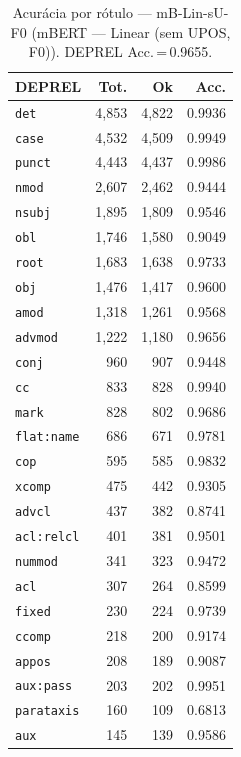\begin{table}[ht]
\centering
\caption{Acurácia por rótulo --- mB-Lin-sU-F0 (mBERT — Linear (sem UPOS, F0)). DEPREL Acc.\,=\,0.9655.}
\label{tab:acc-predict-test-ablacao-linear-google-bert-bert-base-multilingual-cased-fold0}
\scriptsize
\begin{tabular}{lrrr}
\toprule
\textbf{DEPREL} & \textbf{Tot.} & \textbf{Ok} & \textbf{Acc.} \\
\midrule
\texttt{det} & 4,853 & 4,822 & 0.9936 \\
\texttt{case} & 4,532 & 4,509 & 0.9949 \\
\texttt{punct} & 4,443 & 4,437 & 0.9986 \\
\texttt{nmod} & 2,607 & 2,462 & 0.9444 \\
\texttt{nsubj} & 1,895 & 1,809 & 0.9546 \\
\texttt{obl} & 1,746 & 1,580 & 0.9049 \\
\texttt{root} & 1,683 & 1,638 & 0.9733 \\
\texttt{obj} & 1,476 & 1,417 & 0.9600 \\
\texttt{amod} & 1,318 & 1,261 & 0.9568 \\
\texttt{advmod} & 1,222 & 1,180 & 0.9656 \\
\texttt{conj} & 960 & 907 & 0.9448 \\
\texttt{cc} & 833 & 828 & 0.9940 \\
\texttt{mark} & 828 & 802 & 0.9686 \\
\texttt{flat\!:\!name} & 686 & 671 & 0.9781 \\
\texttt{cop} & 595 & 585 & 0.9832 \\
\texttt{xcomp} & 475 & 442 & 0.9305 \\
\texttt{advcl} & 437 & 382 & 0.8741 \\
\texttt{acl\!:\!relcl} & 401 & 381 & 0.9501 \\
\texttt{nummod} & 341 & 323 & 0.9472 \\
\texttt{acl} & 307 & 264 & 0.8599 \\
\texttt{fixed} & 230 & 224 & 0.9739 \\
\texttt{ccomp} & 218 & 200 & 0.9174 \\
\texttt{appos} & 208 & 189 & 0.9087 \\
\texttt{aux\!:\!pass} & 203 & 202 & 0.9951 \\
\texttt{parataxis} & 160 & 109 & 0.6813 \\
\texttt{aux} & 145 & 139 & 0.9586 \\

\end{tabular}
\end{table}
